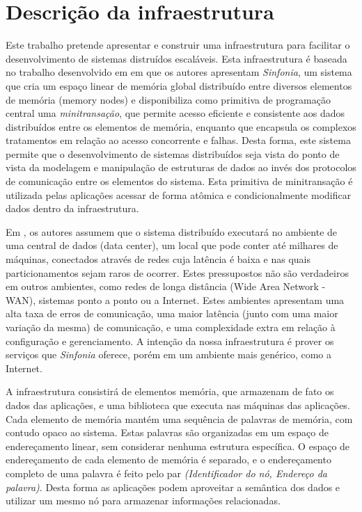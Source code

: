 \documentclass[a4paper,12pt]{report}
\begin{document}
\chapter{Descrição da infraestrutura}
Este trabalho pretende apresentar e construir uma infraestrutura para facilitar o desenvolvimento de sistemas distruídos escaláveis. Esta infraestrutura é baseada no trabalho desenvolvido em \cite{sinfonia} em que os autores apresentam {\em Sinfonia}, um sistema que cria um espaço linear de memória global distribuído entre diversos elementos de memória (memory nodes) e disponibiliza como primitiva de programação central uma {\em minitransação}, que permite acesso eficiente e consistente aos dados distribuídos entre os elementos de memória, enquanto que encapsula os complexos tratamentos em relação ao acesso concorrente e falhas. Desta forma, este sistema permite que o desenvolvimento de sistemas distribuídos seja vista do ponto de vista da modelagem e manipulação de estruturas de dados ao invés dos protocolos de comunicação entre os elementos do sistema. Esta primitiva de minitransação é utilizada pelas aplicações acessar de forma atômica e condicionalmente modificar dados dentro da infraestrutura.

Em \cite{sinfonia}, os autores assumem que o sistema distribuído executará no ambiente de uma central de dados (data center), um local que pode conter até milhares de máquinas, conectados através de redes cuja latência é baixa e nas quais particionamentos sejam raros de ocorrer. Estes pressupostos não são verdadeiros em outros ambientes, como redes de longa distância (Wide Area Network - WAN), sistemas ponto a ponto ou a Internet. Estes ambientes apresentam uma alta taxa de erros de comunicação, uma maior latência (junto com uma maior variação da mesma) de comunicação, e uma complexidade extra em relação à configuração e gerenciamento. A intenção da nossa infraestrutura é prover os serviços que {\em Sinfonia} oferece, porém em um ambiente mais genérico, como a Internet. 

A infraestrutura consistirá de elementos memória, que armazenam de fato os dados das aplicações, e uma biblioteca que executa nas máquinas das aplicações. Cada elemento de memória mantém uma sequência de palavras de memória, com contudo opaco ao sistema. Estas palavras são organizadas em um espaço de endereçamento linear, sem considerar nenhuma estrutura específica. O espaço de endereçamento de cada elemento de memória é separado, e o endereçamento completo de uma palavra é feito pelo par {\em (Identificador do nó, Endereço da palavra)}. Desta forma as aplicações podem aproveitar a semântica dos dados e utilizar um mesmo nó para armazenar informações relacionadas.
\end{document}
